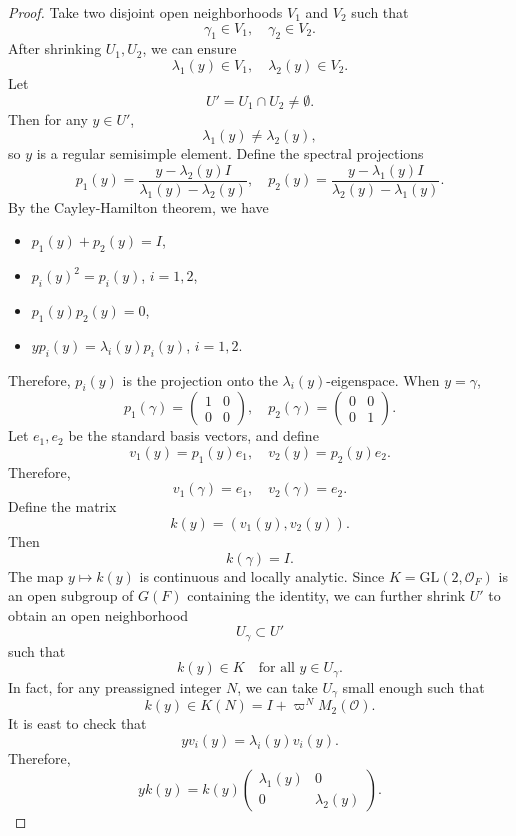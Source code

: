 \documentclass[11pt]{amsart}
\theoremstyle{definition}
\numberwithin{equation}{section}
\begin{document}
\begin{proof}
		
		Take two disjoint open neighborhoods \(V_1\) and \(V_2\) such that
		\[
		\gamma_1\in V_1 , \quad \gamma_2\in V_2.
		\]
		After shrinking \(U_1, U_2\), we can ensure
		\[
		\lambda_1(y) \in V_1, \quad \lambda_2(y) \in V_2.
		\]
		Let
		\[
		U' = U_1 \cap U_2\neq \emptyset.
		\]
		Then for any \(y \in U'\),
		\[
		\lambda_1(y) \neq \lambda_2(y),
		\]
		so \(y\) is a regular semisimple element.
		Define the spectral projections
		\[
		p_1(y) = \frac{y - \lambda_2(y) I}{\lambda_1(y) - \lambda_2(y)},\quad p_2(y) = \frac{y - \lambda_1(y) I}{\lambda_2(y) - \lambda_1(y)}.
		\]
		By the Cayley-Hamilton theorem, we have
		\begin{itemize}
			\item \(p_1(y) + p_2(y) = I\),
			\item \(p_i(y)^2 = p_i(y)\), \(i=1,2\),
			\item \(p_1(y) p_2(y) = 0\),
			\item \(y p_i(y) = \lambda_i(y) p_i(y)\), \(i=1,2\).
		\end{itemize}
		Therefore, \(p_i(y)\) is the projection onto the \(\lambda_i(y)\)-eigenspace.
		When \(y = \gamma\),
		\[
		p_1(\gamma) = \begin{pmatrix} 1 & 0 \\ 0 & 0 \end{pmatrix}, \quad p_2(\gamma) = \begin{pmatrix} 0 & 0 \\ 0 & 1 \end{pmatrix}.
		\]
		Let \(e_1, e_2\) be the standard basis vectors, and define
		\[
		v_1(y) = p_1(y) e_1, \quad v_2(y) = p_2(y) e_2.
		\]
		Therefore,
		\[
		v_1(\gamma) = e_1, \quad v_2(\gamma) = e_2.
		\]
		Define the matrix
		\[
		k(y) = (v_1(y), v_2(y)).
		\]
		Then
		\[
		k(\gamma) = I.
		\]
		The map \(y \mapsto k(y)\) is continuous and locally analytic. Since \(K = \mathrm{GL}(2,\mathcal{O}_F)\) is an open subgroup of \(G(F)\) containing the identity, we can further shrink \(U'\) to obtain an open neighborhood
		\[
		U_\gamma \subset U'
		\]
		such that
		\[
		k(y) \in K \quad \text{for all } y \in U_\gamma.
		\]
		In fact, for any preassigned integer \(N\), we can take \(U_\gamma\) small enough such that
		\[
		k(y) \in K(N) = I + \varpi^N M_2(\mathcal{O}).
		\]
		It is east to check that
		\[
		y v_i(y) = \lambda_i(y) v_i(y).
		\]
		Therefore,
		\[
		y k(y) = k(y) \begin{pmatrix} \lambda_1(y) & 0 \\ 0 & \lambda_2(y) \end{pmatrix}.
\]
\end{proof}
\end{document}
